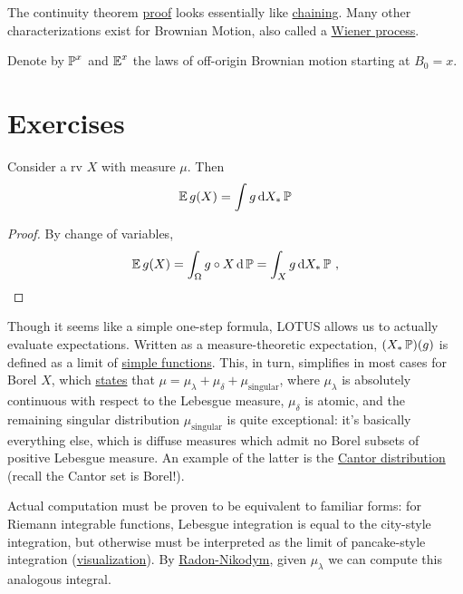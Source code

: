 \documentclass{article}
\begin{document}
The continuity theorem \href{https://almostsuremath.com/2020/10/20/the-kolmogorov-continuity-theorem/}{proof} looks essentially like \href{http://www.stat.yale.edu/~pollard/Books/Mini/Chaining.pdf}{chaining}.
Many other characterizations exist for Brownian Motion, also called a \href{https://en.wikipedia.org/wiki/Wiener_process}{Wiener process}.

\begin{definition}
  Denote by \(\P^x\) and \(\E^x\) the laws of off-origin Brownian motion starting at \(B_0=x\).
  \end{definition}


\section{Exercises}

\begin{theorem}
  Consider a rv \(X\) with measure \(\mu\). Then
  \[
    \E g(X) = \int g \d{X_*\P}
  \]
    \end{theorem}
    \begin{proof}
      By change of variables,
      \[\E g(X)=\int_\Omega g\circ X\d{\P}=\int_X g\d{X_*\P}\,\,,\]
    \end{proof}

    Though it seems like a simple one-step formula, LOTUS allows us to actually evaluate expectations. Written as a measure-theoretic expectation, \((X_*\P)(g)\) is defined as a limit of \href{https://en.wikipedia.org/wiki/Simple_function}{simple functions}. This, in turn, simplifies in most cases for Borel \(X\), which
    \href{https://en.wikipedia.org/wiki/Lebesgue%27s_decomposition_theorem}{states}
      that \(\mu=\mu_{\lambda}+\mu_{\delta}+\mu_{\mathrm{singular}}\), where \(\mu_\lambda\) is absolutely continuous with respect to the Lebesgue measure, \(\mu_\delta\) is atomic, and the remaining singular distribution \(\mu_{\mathrm{singular}}\) is quite exceptional: it's basically everything else, which is diffuse measures which admit no Borel subsets of positive Lebesgue measure. An example of the latter is the \href{https://en.wikipedia.org/wiki/Cantor_distribution}{Cantor distribution} (recall the Cantor set is Borel!).

 Actual computation must be proven to be equivalent to familiar forms: for Riemann integrable functions, Lebesgue integration is equal to the city-style integration, but otherwise must be interpreted as the limit of pancake-style integration (\href{https://upload.wikimedia.org/wikipedia/commons/thumb/1/1b/RandLintegrals.png/375px-RandLintegrals.png}{visualization}). By \href{https://en.wikipedia.org/wiki/Radon%E2%80%93Nikodym_theorem}{Radon-Nikodym}, given \(\mu_\lambda\) we can compute this analogous integral.
\end{document}
